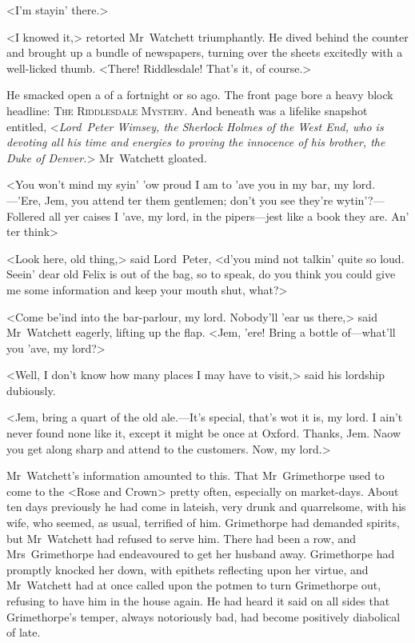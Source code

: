 <I'm stayin' there.>

<I knowed it,> retorted Mr~Watchett triumphantly. He dived behind the counter and brought up a bundle of newspapers, turning over the sheets excitedly with a well-licked thumb. <There! Riddlesdale! That's it, of course.>

He smacked open a  of a fortnight or so ago. The front page bore a heavy block headline: \textsc{The Riddlesdale Mystery}. And beneath was a lifelike snapshot entitled, <\textit{Lord~Peter Wimsey, the Sherlock Holmes of the West End, who is devoting all his time and energies to proving the innocence of his brother, the Duke of Denver.}> Mr~Watchett gloated.

<You won't mind my syin' 'ow proud I am to 'ave you in my bar, my lord.—'Ere, Jem, you attend ter them gentlemen; don't you see they're wytin'?—Follered all yer caises I 'ave, my lord, in the pipers—jest like a book they are. An' ter think\longdash>

<Look here, old thing,> said Lord~Peter, <d'you mind not talkin' quite so loud. Seein' dear old Felix is out of the bag, so to speak, do you think you could give me some information and keep your mouth shut, what?>

<Come be'ind into the bar-parlour, my lord. Nobody'll 'ear us there,> said Mr~Watchett eagerly, lifting up the flap. <Jem, 'ere! Bring a bottle of—what'll you 'ave, my lord?>

<Well, I don't know how many places I may have to visit,> said his lordship dubiously.

<Jem, bring a quart of the old ale.—It's special, that's wot it is, my lord. I ain't never found none like it, except it might be once at Oxford. Thanks, Jem. Naow you get along sharp and attend to the customers. Now, my lord.>

Mr~Watchett's information amounted to this. That Mr~Grimethorpe used to come to the <Rose and Crown> pretty often, especially on market-days. About ten days previously he had come in lateish, very drunk and quarrelsome, with his wife, who seemed, as usual, terrified of him. Grimethorpe had demanded spirits, but Mr~Watchett had refused to serve him. There had been a row, and Mrs~Grimethorpe had endeavoured to get her husband away. Grimethorpe had promptly knocked her down, with epithets reflecting upon her virtue, and Mr~Watchett had at once called upon the potmen to turn Grimethorpe out, refusing to have him in the house again. He had heard it said on all sides that Grimethorpe's temper, always notoriously bad, had become positively diabolical of late.

